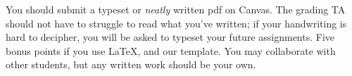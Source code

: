 \documentclass[11pt]{article}
\begin{document}


You should submit a typeset or \emph{neatly} written pdf on Canvas.  The grading TA should not have to struggle to read what you've written; if your handwriting is hard to decipher, you will be asked to typeset your future assignments. Five bonus points if you use \LaTeX, and our template. You may collaborate with other students, but any written work should be your own. 
\end{document}
